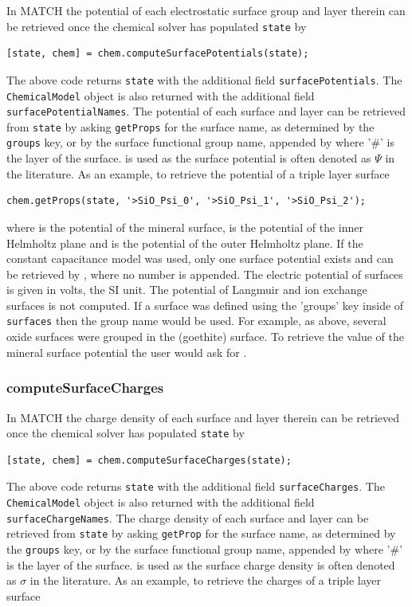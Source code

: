 \documentclass{article}
\begin{document}
In MATCH the potential of each electrostatic surface group and layer therein can be retrieved once the chemical solver has populated \verb|state| by

\begin{lstlisting}
[state, chem] = chem.computeSurfacePotentials(state);
\end{lstlisting}
The above code returns \verb|state| with the additional field \verb|surfacePotentials|. The \verb|ChemicalModel| object is also returned with the additional field \verb|surfacePotentialNames|. The potential of each surface and layer can be retrieved from \verb|state| by asking \verb|getProps| for the surface name, as determined by the \verb|groups| key, or by the surface functional group name, appended by  where '\#' is the layer of the surface.  is used as the surface potential is often denoted as $\Psi$ in the literature. As an example, to retrieve the potential of a triple layer surface 

\begin{lstlisting}
chem.getProps(state, '>SiO_Psi_0', '>SiO_Psi_1', '>SiO_Psi_2');
\end{lstlisting}
where  is the potential of the mineral surface,  is the potential of the inner Helmholtz plane and  is the potential of the outer Helmholtz plane. If the constant capacitance model was used, only one surface potential exists and can be retrieved by , where no number is appended. The electric potential of surfaces is given in volts, the SI unit. The potential of Langmuir and ion exchange surfaces is not computed. If a surface was defined using the 'groups' key inside of \verb|surfaces| then the group name would be used. For example, as above, several oxide surfaces were grouped in the  (goethite) surface. To retrieve the value of the mineral surface potential the user would ask for .

\subsubsection{computeSurfaceCharges}

In MATCH the charge density of each surface and layer therein can be retrieved once the chemical solver has populated \verb|state| by

\begin{lstlisting}
[state, chem] = chem.computeSurfaceCharges(state);
\end{lstlisting}
The above code returns \verb|state| with the additional field \verb|surfaceCharges|. The \verb|ChemicalModel| object is also returned with the additional field \verb|surfaceChargeNames|. The charge density of each surface and layer can be retrieved from \verb|state| by asking \verb|getProp| for the surface name, as determined by the \verb|groups| key, or by the surface functional group name, appended by  where '\#' is the layer of the surface.  is used as the surface charge density is often denoted as $\sigma$ in the literature. As an example, to retrieve the charges of a triple layer surface 
\end{document}
